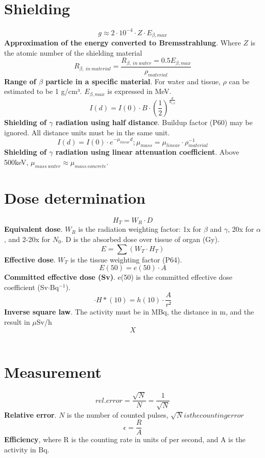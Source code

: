 \section{Shielding}
\[g \approx 2\cdot10^{-4}\cdot Z\cdot E_{\beta,max}\]
\textbf{Approximation of the energy converted to Bremsstrahlung}. Where $Z$ is the atomic number of the shielding material\\
\[R_{\beta,\ in\ material} = \frac{R_{\beta,\ in\ water} = 0.5 E_{\beta,max}}{\rho_{material}}\]
\textbf{Range of $\beta$ particle in a specific material}. For water and tissue, $\rho$ can be estimated to be 1 g/cm³. $E_{\beta,max}$ is expressed in MeV.\\
\[I(d) = I(0)\cdot B\cdot(\frac{1}{2})^{\frac{d}{d_{1/2}}}\]
\textbf{Shielding of $\gamma$ radiation using half distance}. Buildup factor (P60) may be ignored. All distance units must be in the same unit.\\
\[I(d) = I(0)\cdot e^{-\mu_{linear} d}; \mu_{mass} = \mu_{linear}\cdot\rho_{material}^{-1}\]
\textbf{Shielding of $\gamma$ radiation using linear attenuation coefficient}. Above 500keV, $\mu_{mass\ water}\approx\mu_{mass\ concrete}$.\\

\section{Dose determination}
\[H_T = W_R \cdot D\]
\textbf{Equivalent dose}. $W_R$ is the radiation weighting factor: 1x for $\beta$ and $\gamma$, 20x for $\alpha$, and 2-20x for $N_0$. D is the absorbed dose over tissue of organ (Gy).\\
\[E = \sum (W_T \cdot H_T)\]
\textbf{Effective dose}. $W_T$ is the tissue weighting factor (P64). \\
\[E(50) = e(50)\cdot A\]
\textbf{Committed effective dose (Sv)}. e(50) is the committed effective dose coefficient (Sv$\cdot$Bq$^{-1}$).\\
\[\cdot H*(10) = h(10)\cdot\frac{A}{r²}\]
\textbf{Inverse square law}. The activity must be in MBq, the distance in m, and the result in $\mu$Sv/h\\
\[X\]
\textbf{}\\

\section{Measurement}
\[rel. error = \frac{\sqrt{N}}{N} = \frac{1}{\sqrt{N}}\]
\textbf{Relative error}. $N$ is the number of counted pulses, $\sqrt{N} is the counting error$\\
\[\epsilon = \frac{R}{A}\]
\textbf{Efficiency}, where R is the counting rate in units of per second, and A is the activity in Bq.\\
